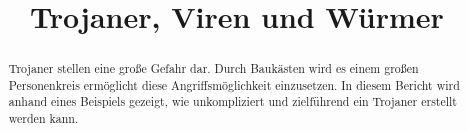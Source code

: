 \documentclass[a4paper, conference, compsoc]{IEEEtran}
\begin{document}
\title{Trojaner, Viren und Würmer}
\author{
}

\maketitle
\thispagestyle{plain}
\pagestyle{plain}

\begin{abstract}
  Trojaner stellen eine große Gefahr dar. Durch Baukästen wird es einem 
  großen Personenkreis ermöglicht diese Angriffsmöglichkeit einzusetzen.
  In diesem Bericht wird anhand eines Beispiels gezeigt, wie unkompliziert
  und zielführend ein Trojaner erstellt werden kann.  
\end{abstract}











\printbibliography{}
\end{document}
